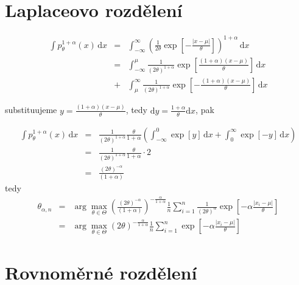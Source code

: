 \documentclass[11pt, a4paper]{article}
\newcommand{\intpa}{\int p_\theta^{1+\alpha}(x) \, \mathrm{d}x }
\newcommand{\amtiT}{\arg \max_{\theta \in \Theta}}
\begin{document}
\section{Laplaceovo rozdělení} %

\begin{eqnarray}
\intpa & = & \int_{-\infty }^{\infty } \left( {\frac{1}{2\theta} \exp{ \left[ -\frac{|x -\mu |}{\theta } \right] }} \right) ^{1 + \alpha} \, \mathrm{d}x \nonumber\\
 & = & \int_{-\infty }^{\mu } {\frac{1}{ (2\theta)^{ 1 + \alpha}} \exp{ \left[ \frac{(1 + \alpha )(x -\mu )}{\theta } \right] }} \, \mathrm{d}x \nonumber\\
 & + & \int_{\mu }^{\infty } {\frac{1}{ (2\theta)^{ 1 + \alpha}} \exp{ \left[ -\frac{(1 + \alpha )(x -\mu )}{\theta } \right] }} \, \mathrm{d}x \nonumber
\end{eqnarray} 

substituujeme $ y = \frac{(1+\alpha)(x-\mu)}{\theta} $, tedy $\mathrm{d}y = \frac{1+\alpha}{\theta}\mathrm{d}x $, pak

\begin{eqnarray}
\intpa & = & \frac{1}{ (2\theta)^{ 1 + \alpha}} \frac{\theta}{1+\alpha} \left( 
\int_{-\infty }^{0 } {\exp{ \left[ y \right] }} \, \mathrm{d}x + 
\int_{0 }^{\infty } {\exp{ \left[ -y \right] }} \, \mathrm{d}x \right) \nonumber\\
& = & \frac{1}{ (2\theta)^{ 1 + \alpha}} \frac{\theta}{1+\alpha} \cdot 2  \nonumber\\
& = & \frac{(2\theta)^{-\alpha}}{(1+\alpha)} 
\end{eqnarray}
tedy 
\begin{eqnarray}
	\theta_{\alpha,n} &= &\amtiT \left( \frac{(2\theta)^{-\alpha}}{(1+\alpha)}  \right)^{-\frac{\alpha}{1+\alpha}} \frac{1}{n} \sum_{i=1}^n \frac{1}{(2\theta)^{\alpha}} \exp \left[-\alpha\frac{|x_i-\mu|}{\theta} \right] \nonumber\\
	&=& \amtiT (2\theta)^{-\frac{\alpha}{1+\alpha}} \frac{1}{n} \sum_{i=1}^n \exp \left[-\alpha\frac{|x_i-\mu|}{\theta} \right]
\end{eqnarray}


\section{Rovnoměrné rozdělení} 
\end{document}
